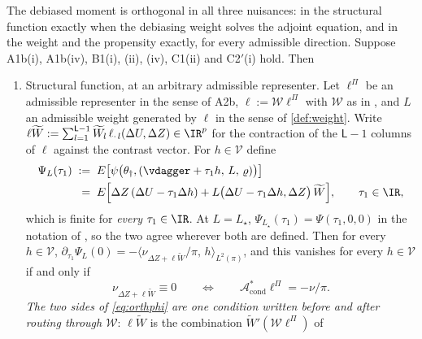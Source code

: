 \begin{proposition}\label{prp:orthog}
The debiased moment is orthogonal in all three nuisances: in the structural function exactly when the
debiasing weight solves the adjoint equation, and in the weight and the propensity exactly, for every
admissible direction.
Suppose A1b(i), A1b(iv), B1(i), (ii), (iv), C1(ii) and C2$'$(i) hold. Then
\begin{enumerate}
\item[(i)] Structural function, at an arbitrary admissible representer. Let $\ell^\Pi$ be an
admissible representer in the sense of A2b, $\ell:=\mathcal W\ell^\Pi$ with $\mathcal W$ as in
, and $L$ an admissible
weight generated by $\ell$ in the sense of \cref{def:weight}. Write
$\ell\widetilde W:=\sum_{l=1}^{\mathsf L-1}\widetilde W_l\,\ell_{\cdot\,l}(\Delta U,\Delta Z)\in\IR^{p}$
for the contraction of the $\mathsf L-1$ columns of $\ell$ against the contrast vector. For
$h\in\mathcal V$ define
\begin{equation}\label{eq:PsiL}
\begin{split}
\Psi_L(\tau_1)\;&:=\;E\big[\psi\big(\theta_\dagger,(\vdagger+\tau_1h,\,L,\,\varrho)\big)\big] \\
&\;=\;E\Big[\Delta Z\,(\Delta U-\tau_1\Delta h)+L\big(\Delta U-\tau_1\Delta h,\Delta Z\big)\,\widetilde W\Big],
\qquad\tau_1\in\IR,
\end{split}
\end{equation}
which is finite for \emph{every} $\tau_1\in\IR$. At $L=L_\star$,
$\Psi_{L_\star}(\tau_1)=\Psi(\tau_1,0,0)$ in the notation of , so the two agree
wherever both are defined. Then for every $h\in\mathcal V$,
$\partial_{\tau_1}\Psi_L(0)=-\big\langle\nu_{\Delta Z+\ell\widetilde W}/\pi,\,h\big\rangle_{L^{2}(\pi)}$,
and this vanishes for every $h\in\mathcal V$ if and only if
\begin{equation}\label{eq:orthphi}
\nu_{\Delta Z+\ell\widetilde W}\equiv0
\qquad\Longleftrightarrow\qquad
\mathcal A^\ast_{\mathrm{cond}}\ell^\Pi=-\nu/\pi .
\end{equation}
\emph{The two sides of \eqref{eq:orthphi} are one condition written before and after routing through
$\mathcal W$}: $\ell\widetilde W$ is the combination $\widetilde W'(\mathcal W\ell^\Pi)$ of

\end{enumerate}
\end{proposition}
